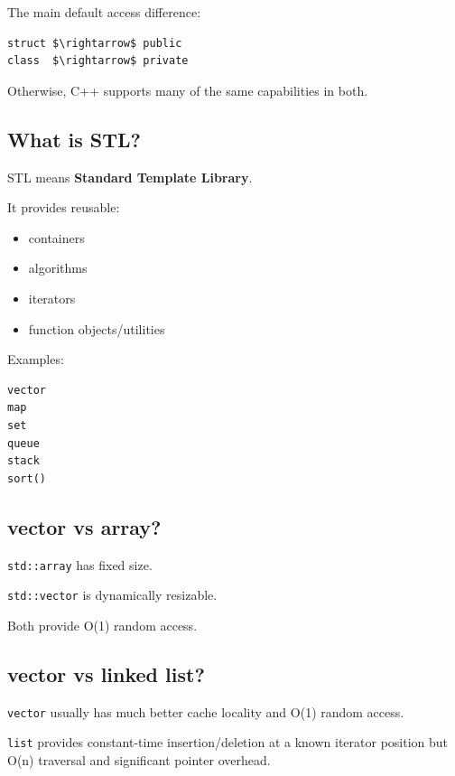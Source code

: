 The main default access difference:

\begin{lstlisting}
struct $\rightarrow$ public
class  $\rightarrow$ private
\end{lstlisting}

Otherwise, C++ supports many of the same capabilities in both.

\medskip

\subsection{What is STL?}

STL means \textbf{Standard Template Library}.

It provides reusable:

\begin{itemize}
  \item containers
  \item algorithms
  \item iterators
  \item function objects/utilities
\end{itemize}

Examples:

\begin{lstlisting}
vector
map
set
queue
stack
sort()
\end{lstlisting}

\medskip

\subsection{vector vs array?}

\texttt{std::array} has fixed size.

\texttt{std::vector} is dynamically resizable.

Both provide O(1) random access.

\medskip

\subsection{vector vs linked list?}

\texttt{vector} usually has much better cache locality and O(1) random access.

\texttt{list} provides constant-time insertion/deletion at a known iterator position but O(n) traversal and significant pointer overhead.

\medskip

